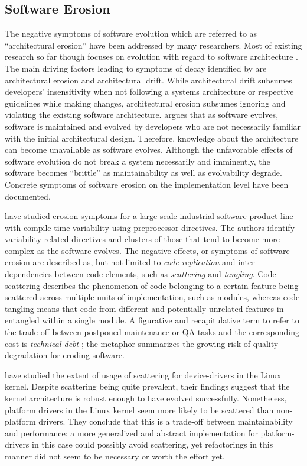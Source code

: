 \subsection{Software Erosion}
The negative symptoms of software evolution which are referred to as
``architectural erosion'' \citep{breivold_systematic_2012} have
been addressed by many researchers.
Most of existing research so far though focuses on evolution with regard to
software architecture \citep{breivold_systematic_2012}. The main driving factors leading to symptoms of decay
identified by \cite{perry_software_1991} are architectural erosion and
architectural drift. While architectural drift subsumes developers'
insensitivity when not following a systems architecture or respective guidelines while making changes, architectural erosion subsumes ignoring and violating the existing software
architecture. \cite{parnas_software_1994} argues that as software evolves, software is maintained
and evolved by developers who are not necessarily familiar with the initial
architectural design. Therefore, knowledge about the architecture can become
unavailable as software evolves. Although the unfavorable effects of software
evolution do not break a system necessarily and imminently, the software becomes ``brittle'' \citep{perry_software_1991}
as maintainability as well as evolvability degrade. Concrete  symptoms of software
erosion on the implementation level have been documented. 

\cite{zhang_variability_2013} have studied erosion symptoms for a large-scale
industrial software product line with compile-time variability using
preprocessor directives.
The authors identify variability-related directives and clusters of those that
tend to become more complex as the software evolves. The negative effects, or symptoms of software
erosion are described as, but not limited to \emph{code replication} and
inter-dependencies between code elements, such as \emph{scattering} and
\emph{tangling}. Code scattering describes the phenomenon of code belonging to
a certain feature being scattered across multiple units of implementation,
such as modules, whereas code tangling means that code from different and
potentially unrelated features in entangled within a single module. A figurative
and recapitulative term to refer to the trade-off between postponed maintenance
or QA tasks and the corresponding cost is \emph{technical debt}
\citep{guo_tracking_2011}; the metaphor summarizes the growing risk of quality
degradation for eroding software.

\cite{passos_feature_2015} have studied the extent of usage of scattering for device-drivers
in the Linux kernel. Despite scattering being quite prevalent, their
findings suggest that the kernel architecture is robust enough to have evolved
successfully. Nonetheless, platform drivers in the Linux kernel seem more
likely to be scattered than non-platform drivers. They conclude that this is a
trade-off between maintainability and performance: a more generalized and
abstract implementation for platform-drivers in this case could possibly avoid
scattering, yet refactorings in this manner did not seem to be necessary or
worth the effort yet. 


